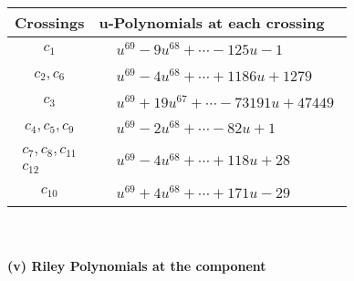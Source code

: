 \documentclass[1p]{elsarticle_modified}
\theoremstyle{definition}
\begin{document}
\begin{tabular}{m{50pt}|m{274pt}}
Crossings & \hspace{64pt}u-Polynomials at each crossing \\
\hline $$\begin{aligned}c_{1}\end{aligned}$$&$\begin{aligned}
&u^{69}-9 u^{68}+\cdots-125 u-1
\end{aligned}$\\
\hline $$\begin{aligned}c_{2},c_{6}\end{aligned}$$&$\begin{aligned}
&u^{69}-4 u^{68}+\cdots+1186 u+1279
\end{aligned}$\\
\hline $$\begin{aligned}c_{3}\end{aligned}$$&$\begin{aligned}
&u^{69}+19 u^{67}+\cdots-73191 u+47449
\end{aligned}$\\
\hline $$\begin{aligned}c_{4},c_{5},c_{9}\end{aligned}$$&$\begin{aligned}
&u^{69}-2 u^{68}+\cdots-82 u+1
\end{aligned}$\\
\hline $$\begin{aligned}c_{7},c_{8},c_{11}\\c_{12}\end{aligned}$$&$\begin{aligned}
&u^{69}-4 u^{68}+\cdots+118 u+28
\end{aligned}$\\
\hline $$\begin{aligned}c_{10}\end{aligned}$$&$\begin{aligned}
&u^{69}+4 u^{68}+\cdots+171 u-29
\end{aligned}$\\
\hline
\end{tabular}\\~\\
\newpage\renewcommand{\arraystretch}{1}
\flushleft \textbf{(v) Riley Polynomials at the component}\newline \\
\end{document}
